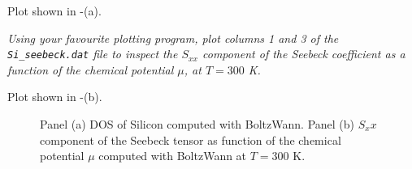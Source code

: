 Plot shown in -(a).


{\it Using your favourite plotting program, plot columns 1 and 3 of the {\tt Si\_seebeck.dat} file to inspect the
$S_{xx}$ component of the Seebeck coefficient as a function of the chemical potential $\mu$, at $T = 300$ K.}

Plot shown in -(b).

\begin{figure}[h!]
\centering
{}
\centering
{}
\caption{Panel (a) DOS of Silicon computed with {\sc BoltzWann}. Panel (b) $S_xx$ component of the Seebeck tensor as function of the chemical potential $\mu$ computed with {\sc BoltzWann} at $T = 300$ K.}\label{fig16.1}
\end{figure}


